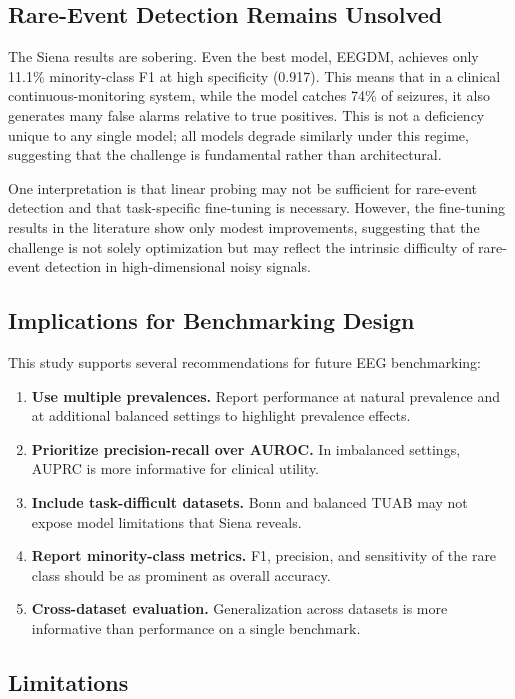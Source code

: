\documentclass[journal]{IEEEtran}
\begin{document}
\subsection{Rare-Event Detection Remains Unsolved}

The Siena results are sobering. Even the best model, EEGDM, achieves only 11.1\% minority-class F1 at high specificity (0.917). This means that in a clinical continuous-monitoring system, while the model catches 74\% of seizures, it also generates many false alarms relative to true positives. This is not a deficiency unique to any single model; all models degrade similarly under this regime, suggesting that the challenge is fundamental rather than architectural.

One interpretation is that linear probing may not be sufficient for rare-event detection and that task-specific fine-tuning is necessary. However, the fine-tuning results in the literature show only modest improvements, suggesting that the challenge is not solely optimization but may reflect the intrinsic difficulty of rare-event detection in high-dimensional noisy signals.

\subsection{Implications for Benchmarking Design}

This study supports several recommendations for future EEG benchmarking:

\begin{enumerate}
  \item \textbf{Use multiple prevalences.} Report performance at natural prevalence and at additional balanced settings to highlight prevalence effects.
  \item \textbf{Prioritize precision-recall over AUROC.} In imbalanced settings, AUPRC is more informative for clinical utility.
  \item \textbf{Include task-difficult datasets.} Bonn and balanced TUAB may not expose model limitations that Siena reveals.
  \item \textbf{Report minority-class metrics.} F1, precision, and sensitivity of the rare class should be as prominent as overall accuracy.
  \item \textbf{Cross-dataset evaluation.} Generalization across datasets is more informative than performance on a single benchmark.
\end{enumerate}

\subsection{Limitations}
\end{document}

